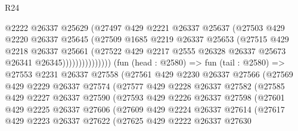 \begin{lexlean}{R24}
\begin{coremodule}
                            @2222
                            @26337
                            @25629
                            (@27497
                              @429
                              @2221
                              @26337
                              @25637
                              (@27503
                                @429
                                @2220
                                @26337
                                @25645
                                (@27509
                                  @1685
                                  @2219
                                  @26337
                                  @25653
                                  (@27515
                                    @429
                                    @2218
                                    @26337
                                    @25661
                                    (@27522
                                      @429
                                      @2217
                                      @2555
                                      @26328
                                      @26337
                                      @25673
                                      @26341
                                      @26345)))))))))))))))
        (fun (head : @2580) =>
        fun (tail : @2580) =>
        @27553
          @2231
          @26337
          @27558
          (@27561
            @429
            @2230
            @26337
            @27566
            (@27569
              @429
              @2229
              @26337
              @27574
              (@27577
                @429
                @2228
                @26337
                @27582
                (@27585
                  @429
                  @2227
                  @26337
                  @27590
                  (@27593
                    @429
                    @2226
                    @26337
                    @27598
                    (@27601
                      @429
                      @2225
                      @26337
                      @27606
                      (@27609
                        @429
                        @2224
                        @26337
                        @27614
                        (@27617
                          @429
                          @2223
                          @26337
                          @27622
                          (@27625
                            @429
                            @2222
                            @26337
                            @27630

\end{coremodule}
\end{lexlean}
